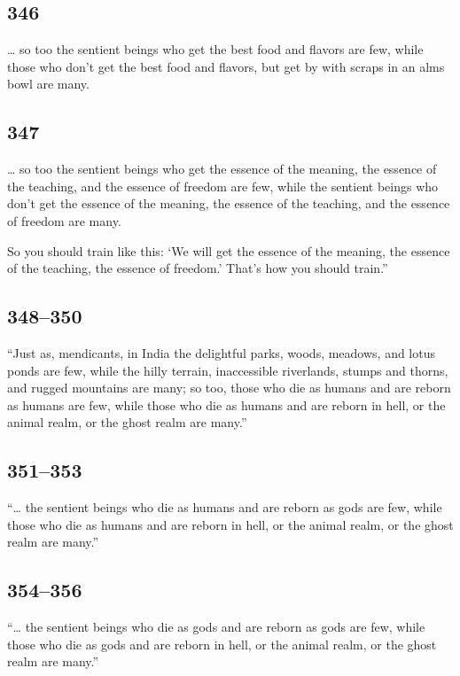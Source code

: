 \documentclass[12pt,openany]{book}%
\begin{document}
\subsection*{346 }

… so too the sentient beings who get the best food and flavors are few, while those who don’t get the best food and flavors, but get by with scraps in an alms bowl are many. 

\subsection*{347 }

… so too the sentient beings who get the essence of the meaning, the essence of the teaching, and the essence of freedom are few, while the sentient beings who don’t get the essence of the meaning, the essence of the teaching, and the essence of freedom are many. 

So you should train like this: ‘We will get the essence of the meaning, the essence of the teaching, the essence of freedom.’ That’s how you should train.” 

\subsection*{348–350 }

“Just as, mendicants, in India the delightful parks, woods, meadows, and lotus ponds are few, while the hilly terrain, inaccessible riverlands, stumps and thorns, and rugged mountains are many; so too, those who die as humans and are reborn as humans are few, while those who die as humans and are reborn in hell, or the animal realm, or the ghost realm are many.” 

\subsection*{351–353 }

“… the sentient beings who die as humans and are reborn as gods are few, while those who die as humans and are reborn in hell, or the animal realm, or the ghost realm are many.” 

\subsection*{354–356 }

“… the sentient beings who die as gods and are reborn as gods are few, while those who die as gods and are reborn in hell, or the animal realm, or the ghost realm are many.” 
\end{document}
